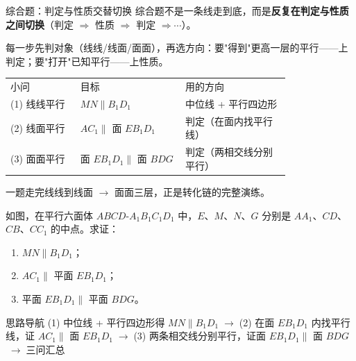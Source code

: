 \documentclass{exam-zh}
\begin{document}
\clearpage
{}


\begin{eduSolutionBox}{综合题：判定与性质交替切换}
  \begingroup
  \setlength{\parskip}{2.5mm}
综合题不是一条线走到底，而是\textbf{反复在判定与性质之间切换}（判定 $\Rightarrow$ 性质 $\Rightarrow$ 判定 $\Rightarrow \cdots$）。\par
每一步先判对象（线线/线面/面面），再选方向：要"得到"更高一层的平行——上判定；要"打开"已知平行——上性质。\par
\begin{tabular}{p{0.20\linewidth}p{0.30\linewidth}p{0.30\linewidth}}
小问 & 目标 & 用的方向\\
(1) 线线平行 & $MN\parallel B_{1}D_{1}$ & 中位线 + 平行四边形\\
(2) 线面平行 & $AC_{1}\parallel$ 面 $EB_{1}D_{1}$ & 判定（在面内找平行线）\\
(3) 面面平行 & 面 $EB_{1}D_{1}\parallel$ 面 $BDG$ & 判定（两相交线分别平行）\\
\end{tabular}
\par
一题走完线线到线面 $\to$ 面面三层，正是转化链的完整演练。\par
  \endgroup
\end{eduSolutionBox}




\begin{eduProblemBlock}[例题 4]
如图，在平行六面体 $ABCD$-$A_{1}B_{1}C_{1}D_{1}$ 中，$E$、$M$、$N$、$G$ 分别是 $AA_{1}$、$CD$、$CB$、$CC_{1}$ 的中点。求证：
\begin{enumerate}[label=(\arabic*)]
  \item $MN\parallel B_{1}D_{1}$；
  \item $AC_{1}\parallel$ 平面 $EB_{1}D_{1}$；
  \item 平面 $EB_{1}D_{1}\parallel$ 平面 $BDG$。
\end{enumerate}

\end{eduProblemBlock}





\begin{eduAuxItem}{思路导航}
(1) 中位线 + 平行四边形得 $MN\parallel B_{1}D_{1}$$\;\to\;$(2) 在面 $EB_{1}D_{1}$ 内找平行线，证 $AC_{1}\parallel$ 面 $EB_{1}D_{1}$$\;\to\;$(3) 两条相交线分别平行，证面 $EB_{1}D_{1}\parallel$ 面 $BDG$$\;\to\;$三问汇总\end{eduAuxItem}
\end{document}
